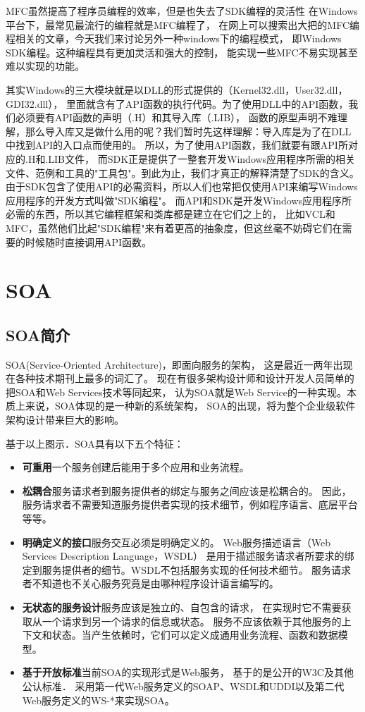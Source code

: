 \documentclass{book}
\begin{document}
MFC虽然提高了程序员编程的效率，但是也失去了SDK编程的灵活性
在Windows平台下，最常见最流行的编程就是MFC编程了，
在网上可以搜索出大把的MFC编程相关的文章，今天我们来讨论另外一种windows下的编程模式，
即Windows SDK编程。这种编程具有更加灵活和强大的控制，
能实现一些MFC不易实现甚至难以实现的功能。

其实Windows的三大模块就是以DLL的形式提供的（Kernel32.dll，User32.dll，GDI32.dll），
里面就含有了API函数的执行代码。为了使用DLL中的API函数，我们必须要有API函数的声明（.H）和其导入库（.LIB），
函数的原型声明不难理解，那么导入库又是做什么用的呢？我们暂时先这样理解：导入库是为了在DLL中找到API的入口点而使用的。
所以，为了使用API函数，我们就要有跟API所对应的.H和.LIB文件，
而SDK正是提供了一整套开发Windows应用程序所需的相关文件、范例和工具的"工具包"。到此为止，我们才真正的解释清楚了SDK的含义。
由于SDK包含了使用API的必需资料，所以人们也常把仅使用API来编写Windows应用程序的开发方式叫做"SDK编程"。
而API和SDK是开发Windows应用程序所必需的东西，所以其它编程框架和类库都是建立在它们之上的，
比如VCL和MFC，虽然他们比起"SDK编程"来有着更高的抽象度，但这丝毫不妨碍它们在需要的时候随时直接调用API函数。


\chapter{SOA}

\section{SOA简介}

SOA(Service-Oriented Architecture)，即面向服务的架构，
这是最近一两年出现在各种技术期刊上最多的词汇了。
现在有很多架构设计师和设计开发人员简单的把SOA和Web Services技术等同起来，
认为SOA就是Web Service的一种实现。本质上来说，SOA体现的是一种新的系统架构，
SOA的出现，将为整个企业级软件架构设计带来巨大的影响。

基于以上图示．SOA具有以下五个特征：

\begin{itemize}
\item{\textbf{可重用}}一个服务创建后能用于多个应用和业务流程。
\item{\textbf{松耦合}}服务请求者到服务提供者的绑定与服务之间应该是松耦合的。
因此，服务请求者不需要知道服务提供者实现的技术细节，例如程序语言、底层平台等等。
\item{\textbf{明确定义的接口}}服务交互必须是明确定义的。
Web服务描述语言（Web Services Description Language，WSDL）
是用于描述服务请求者所要求的绑定到服务提供者的细节。WSDL不包括服务实现的任何技术细节。
服务请求者不知道也不关心服务究竟是由哪种程序设计语言编写的。
\item{\textbf{无状态的服务设计}}服务应该是独立的、自包含的请求，
在实现时它不需要获取从一个请求到另一个请求的信息或状态。
服务不应该依赖于其他服务的上下文和状态。当产生依赖时，它们可以定义成通用业务流程、函数和数据模型。
\item{\textbf{基于开放标准}}当前SOA的实现形式是Web服务，
基于的是公开的W3C及其他公认标准．
采用第一代Web服务定义的SOAP、WSDL和UDDI以及第二代Web服务定义的WS-*来实现SOA。
\end{itemize}
\end{document}
